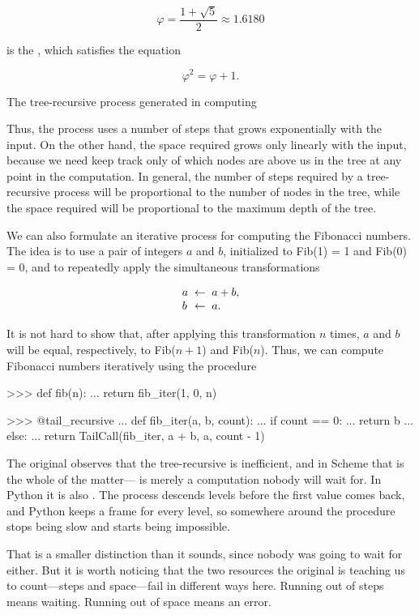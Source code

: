 $$\varphi = \frac{1 + \sqrt{5}}{2} \approx 1.6180 $$

\noindent
is the , which satisfies the equation

$$\varphi^2 = \varphi + 1. $$


\begin{imageFigure}{The tree-recursive process generated in computing }
  
\end{imageFigure}

\noindent
Thus, the process uses a number of steps that grows exponentially with the
input.  On the other hand, the space required grows only linearly with the
input, because we need keep track only of which nodes are above us in the tree
at any point in the computation.  In general, the number of steps required by a
tree-recursive process will be proportional to the number of nodes in the tree,
while the space required will be proportional to the maximum depth of the tree.

We can also formulate an iterative process for computing the Fibonacci numbers.
The idea is to use a pair of integers \( a \) and \( b \), initialized to
Fib(1) = 1 and Fib(0) = 0, and to repeatedly apply the
simultaneous transformations

$$
\begin{array}{l@{\;\;\gets\;\;}l}
  a & a + b, \\
  b & a.
\end{array}
$$

\noindent
It is not hard to show that, after applying this transformation \( n \) times,
\( a \) and \( b \) will be equal, respectively, to Fib(\( n+1 \)) and
Fib(\( n \)).  Thus, we can compute Fibonacci numbers iteratively using
the procedure

\begin{codeBlock}
>>> def fib(n):
...     return fib_iter(1, 0, n)

>>> @tail_recursive
... def fib_iter(a, b, count):
...     if count == 0:
...         return b
...     else:
...         return TailCall(fib_iter, a + b, a, count - 1)
\end{codeBlock}

\noindent
\begin{departure}
The original observes that the tree-recursive  is inefficient, and
in Scheme that is the whole of the matter--- is merely a
computation nobody will wait for.  In Python it is also .  The
process descends  levels before the first value comes back, and Python
keeps a frame for every level, so somewhere around  the
procedure stops being slow and starts being impossible.

That is a smaller distinction than it sounds, since nobody was going to wait
for  either.  But it is worth noticing that the two resources
the original is teaching us to count---steps and space---fail in different
ways here.  Running out of steps means waiting.  Running out of space means an
error.
\end{departure}

